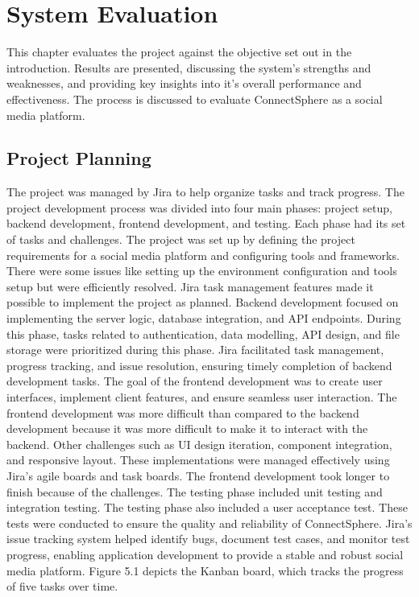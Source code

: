 \chapter{System Evaluation}
This chapter evaluates the project against the objective set out in the introduction. Results are presented, discussing the system's strengths and weaknesses, and providing key insights into it's overall performance and effectiveness. The process is discussed to evaluate ConnectSphere as a social media platform.

\section{Project Planning}
The project was managed by Jira to help organize tasks and track progress. The project development process was divided into four main phases: project setup, backend development, frontend development, and testing. Each phase had its set of tasks and challenges. The project was set up by defining the project requirements for a social media platform and configuring tools and frameworks. There were some issues like setting up the environment configuration and tools setup but were efficiently resolved. Jira task management features made it possible to implement the project as planned. Backend development focused on implementing the server logic, database integration, and API endpoints. During this phase, tasks related to authentication, data modelling, API design, and file storage were prioritized during this phase. Jira facilitated task management, progress tracking, and issue resolution, ensuring timely completion of backend development tasks. The goal of the frontend development was to create user interfaces, implement client features, and ensure seamless user interaction. The frontend development was more difficult than compared to the backend development because it was more difficult to make it to interact with the backend. Other challenges such as UI design iteration, component integration, and responsive layout. These implementations were managed effectively using Jira's agile boards and task boards. The frontend development took longer to finish because of the challenges. The testing phase included unit testing and integration testing. The testing phase also included a user acceptance test. These tests were conducted to ensure the quality and reliability of ConnectSphere. Jira's issue tracking system helped identify bugs, document test cases, and monitor test progress, enabling application development to provide a stable and robust social media platform. Figure 5.1 depicts the Kanban board, which tracks the progress of five tasks over time.

